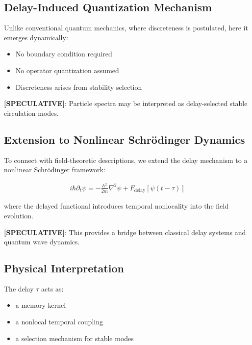 \documentclass[11pt]{article}
\theoremstyle{definition}
\theoremstyle{plain}
\theoremstyle{remark}
\begin{document}
    \subsection{Delay-Induced Quantization Mechanism}
        
        Unlike conventional quantum mechanics, where discreteness is postulated, here it emerges dynamically:
        
        \begin{itemize}
            \item No boundary condition required
            \item No operator quantization assumed
            \item Discreteness arises from stability selection
        \end{itemize}
        
        \textbf{[SPECULATIVE]}: Particle spectra may be interpreted as delay-selected stable circulation modes.
    
    \subsection{Extension to Nonlinear Schrödinger Dynamics}
        
        To connect with field-theoretic descriptions, we extend the delay mechanism to a nonlinear Schrödinger framework:
        
        \begin{align}
            i \hbar \partial_t \psi = -\frac{\hbar^2}{2m} \nabla^2 \psi + F_{\text{delay}}[\psi(t - \tau)]
        \end{align}
        
        where the delayed functional introduces temporal nonlocality into the field evolution.
        
        \textbf{[SPECULATIVE]}: This provides a bridge between classical delay systems and quantum wave dynamics.
    
    \subsection{Physical Interpretation}
        
        The delay $\tau$ acts as:
        
        \begin{itemize}
            \item a memory kernel
            \item a nonlocal temporal coupling
            \item a selection mechanism for stable modes
        \end{itemize}
        
\end{document}
